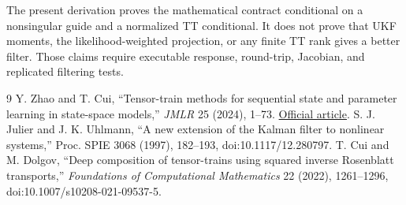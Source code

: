 \documentclass[11pt]{article}
\begin{document}
The present derivation proves the mathematical contract conditional on a
nonsingular guide and a normalized TT conditional. It does not prove that UKF
moments, the likelihood-weighted projection, or any finite TT rank gives a
better filter. Those claims require executable response, round-trip, Jacobian,
and replicated filtering tests.

\begin{thebibliography}{9}
 Y. Zhao and T. Cui, ``Tensor-train methods for sequential
state and parameter learning in state-space models,'' \emph{JMLR} 25 (2024),
1--73. \href{https://www.jmlr.org/papers/v25/23-0743.html}{Official article}.
 S. J. Julier and J. K. Uhlmann, ``A new extension
of the Kalman filter to nonlinear systems,'' Proc. SPIE 3068 (1997), 182--193,
doi:10.1117/12.280797.
 T. Cui and M. Dolgov, ``Deep composition of
tensor-trains using squared inverse Rosenblatt transports,'' \emph{Foundations
of Computational Mathematics} 22 (2022), 1261--1296,
doi:10.1007/s10208-021-09537-5.
\end{thebibliography}
\end{document}
